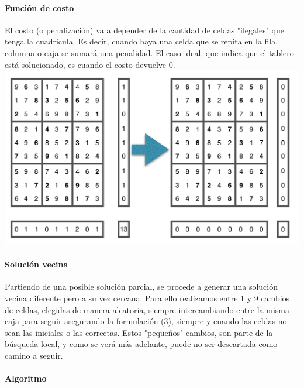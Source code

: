 \paragraph{Función de costo}
El costo (o penalización) va a depender de la cantidad de celdas "ilegales" que tenga la cuadricula. Es decir, cuando haya una celda que se repita en la fila, columna o caja se sumará una penalidad. El caso ideal, que indica que el tablero está solucionado, es cuando el costo devuelve 0.\\
\includegraphics[scale=0.6]{imgs/costo.png}	
\paragraph{Solución vecina}
Partiendo de una posible solución parcial, se procede a generar una solución vecina diferente pero a su vez cercana. Para ello realizamos entre 1 y 9 cambios de celdas, elegidas de manera aleatoria, siempre intercambiando entre la misma caja para seguir asegurando la formulación (3), siempre y cuando las celdas no sean las iniciales o las correctas. Estos "pequeños" cambios, son parte de la búsqueda local, y como se verá más adelante, puede no ser descartada como camino a seguir.

\paragraph{Algoritmo}
